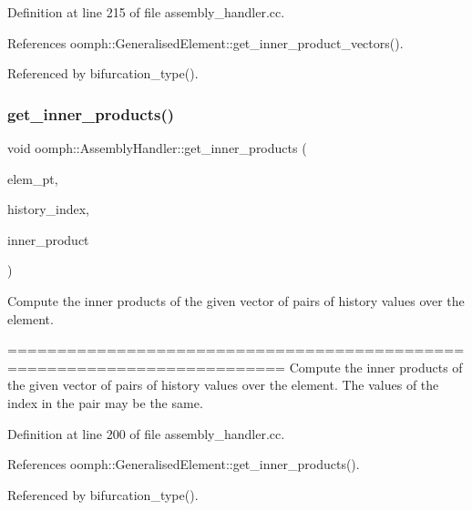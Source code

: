 Definition at line 215 of file assembly\+\_\+handler.\+cc.



References oomph\+::\+Generalised\+Element\+::get\+\_\+inner\+\_\+product\+\_\+vectors().



Referenced by bifurcation\+\_\+type().

\mbox{\label{classoomph_1_1AssemblyHandler_a60c8efc6756825df9cd41389cdeac6cc}} 
\subsubsection{\texorpdfstring{get\+\_\+inner\+\_\+products()}{get\_inner\_products()}}
{\footnotesize\ttfamily void oomph\+::\+Assembly\+Handler\+::get\+\_\+inner\+\_\+products (\begin{DoxyParamCaption}\item[{\hyperlink{classoomph_1_1GeneralisedElement}{Generalised\+Element} $\ast$const \&}]{elem\+\_\+pt,  }\item[{\hyperlink{classoomph_1_1Vector}{Vector}$<$ std\+::pair$<$ unsigned, unsigned $>$ $>$ const \&}]{history\+\_\+index,  }\item[{\hyperlink{classoomph_1_1Vector}{Vector}$<$ double $>$ \&}]{inner\+\_\+product }\end{DoxyParamCaption})\hspace{0.3cm}{\ttfamily [virtual]}}



Compute the inner products of the given vector of pairs of history values over the element. 

========================================================================== Compute the inner products of the given vector of pairs of history values over the element. The values of the index in the pair may be the same. 

Definition at line 200 of file assembly\+\_\+handler.\+cc.



References oomph\+::\+Generalised\+Element\+::get\+\_\+inner\+\_\+products().



Referenced by bifurcation\+\_\+type().


